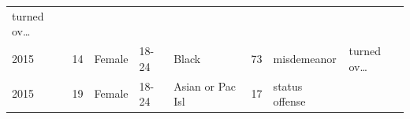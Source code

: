 \documentclass[]{article}
\begin{document}
\begin{longtable}[]{@{}llllllll@{}}
\begin{minipage}[t]{0.14\columnwidth}
turned ov\ldots{}\strut
\end{minipage}\tabularnewline
\begin{minipage}[t]{0.06\columnwidth}\raggedright\strut
2015\strut
\end{minipage} & \begin{minipage}[t]{0.07\columnwidth}\raggedright\strut
14\strut
\end{minipage} & \begin{minipage}[t]{0.07\columnwidth}\raggedright\strut
Female\strut
\end{minipage} & \begin{minipage}[t]{0.07\columnwidth}\raggedright\strut
18-24\strut
\end{minipage} & \begin{minipage}[t]{0.16\columnwidth}\raggedright\strut
Black\strut
\end{minipage} & \begin{minipage}[t]{0.08\columnwidth}\raggedright\strut
73\strut
\end{minipage} & \begin{minipage}[t]{0.14\columnwidth}\raggedright\strut
misdemeanor\strut
\end{minipage} & \begin{minipage}[t]{0.14\columnwidth}\raggedright\strut
turned ov\ldots{}\strut
\end{minipage}\tabularnewline
\begin{minipage}[t]{0.06\columnwidth}\raggedright\strut
2015\strut
\end{minipage} & \begin{minipage}[t]{0.07\columnwidth}\raggedright\strut
19\strut
\end{minipage} & \begin{minipage}[t]{0.07\columnwidth}\raggedright\strut
Female\strut
\end{minipage} & \begin{minipage}[t]{0.07\columnwidth}\raggedright\strut
18-24\strut
\end{minipage} & \begin{minipage}[t]{0.16\columnwidth}\raggedright\strut
Asian or Pac Isl\strut
\end{minipage} & \begin{minipage}[t]{0.08\columnwidth}\raggedright\strut
17\strut
\end{minipage} & \begin{minipage}[t]{0.14\columnwidth}\raggedright\strut
status offense\strut
\end{minipage} & \begin{minipage}[t]{0.14\columnwidth}\raggedright\strut

\end{minipage}
\end{longtable}
\end{document}
